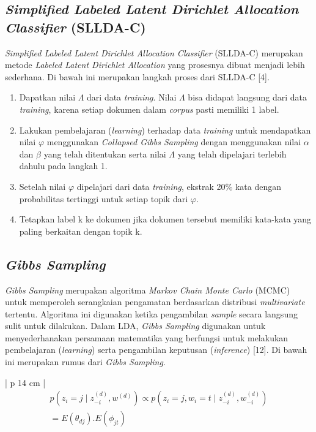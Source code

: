 \subsection{{\itshape Simplified Labeled Latent Dirichlet Allocation Classifier} (SLLDA-C)}
\indent
{{\itshape Simplified Labeled Latent Dirichlet Allocation Classifier} (SLLDA-C) merupakan metode {\itshape Labeled Latent Dirichlet Allocation} yang prosesnya dibuat menjadi lebih sederhana. Di bawah ini merupakan langkah proses dari SLLDA-C [4].

\begin{enumerate}[nolistsep,leftmargin=0.5cm]
\item
Dapatkan nilai $\Lambda$ dari data {\itshape training}. Nilai $\Lambda$ bisa didapat langsung dari data {\itshape training}, karena setiap dokumen dalam {\itshape corpus} pasti memiliki 1 label.
\item
Lakukan pembelajaran ({\itshape learning}) terhadap data {\itshape training} untuk mendapatkan nilai $\varphi$ menggunakan {\itshape Collapsed Gibbs Sampling} dengan menggunakan nilai $\alpha$ dan $\beta$ yang telah ditentukan serta nilai $\Lambda$ yang telah dipelajari terlebih dahulu pada langkah 1.
\item
Setelah nilai $\varphi$ dipelajari dari data {\itshape training}, ekstrak 20\% kata dengan probabilitas tertinggi untuk setiap topik dari $\varphi$.
\item
Tetapkan label k ke dokumen jika dokumen tersebut memiliki kata-kata yang paling berkaitan dengan topik k.
\end{enumerate}

\subsection{{\itshape Gibbs Sampling}}
\indent
{\itshape Gibbs Sampling} merupakan algoritma {\itshape Markov Chain Monte Carlo} (MCMC) untuk memperoleh serangkaian pengamatan berdasarkan distribusi {\itshape multivariate} tertentu. Algoritma ini digunakan ketika pengambilan {\itshape sample} secara langsung sulit untuk dilakukan. Dalam LDA, {\itshape Gibbs Sampling} digunakan untuk menyederhanakan persamaan matematika yang berfungsi untuk melakukan pembelajaran ({\itshape learning}) serta pengambilan keputusan ({\itshape inference}) [12]. Di bawah ini merupakan rumus dari {\itshape Gibbs Sampling}.

\begin{table}[H]
\small
\centering
\begin{adjustbox}{width=1\textwidth}
\begin{tabular}{| p {14 cm} |}
\hline
{}
\begin{equation}
\begin{split}
p(z_{i}=j \mid z_{-i}^{(d)}, w^{(d)}) \propto p(z_{i}=j, w_{i}=t \mid z_{-i}^{(d)}, w_{-i}^{(d)})\\
 = E(\theta _{dj}).E(\phi _{jt})
\end{split}
\end{equation}\\
\hline
\end{tabular}
\end{adjustbox}
\end{table}

}
